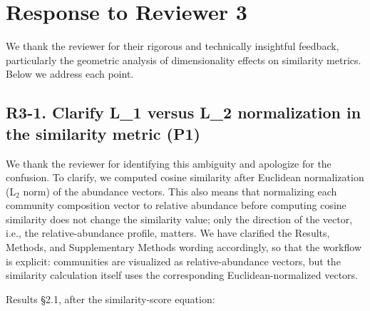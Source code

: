 \section*{Response to Reviewer 3}

We thank the reviewer for their rigorous and technically insightful feedback, particularly the geometric analysis of dimensionality effects on similarity metrics. Below we address each point.

\subsection*{R3-1. Clarify L\_1 versus L\_2 normalization in the similarity metric (P1)}


\responselabel
We thank the reviewer for identifying this ambiguity and apologize for the confusion. To clarify, we computed cosine similarity after Euclidean normalization (L$_2$ norm) of the abundance vectors. This also means that normalizing each community composition vector to relative abundance before computing cosine similarity does not change the similarity value; only the direction of the vector, i.e., the relative-abundance profile, matters. We have clarified the Results, Methods, and Supplementary Methods wording accordingly, so that the workflow is explicit: communities are visualized as relative-abundance vectors, but the similarity calculation itself uses the corresponding Euclidean-normalized vectors.


Results \S2.1, after the similarity-score equation: 

